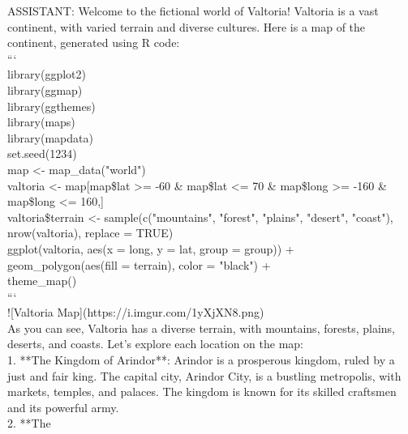 \documentclass[10pt]{article}
\begin{document}
\begin{Form}
\begin{tcolorbox}[colback=convbg,colframe=itemframe,boxrule=0.8pt,arc=2pt,breakable,left=6pt,right=6pt,top=5pt,bottom=5pt]
{ASSISTANT: Welcome to the fictional world of Valtoria! Valtoria is a vast continent, with varied terrain and diverse cultures. Here is a map of the continent, generated using R code: \\[2pt]
``` \\[2pt]
library(ggplot2) \\[2pt]
library(ggmap) \\[2pt]
library(ggthemes) \\[2pt]
library(maps) \\[2pt]
library(mapdata) \\[2pt]
set.seed(1234) \\[2pt]
map <- map\_data("world") \\[2pt]
valtoria <- map[map\$lat >= -60 \& map\$lat <= 70 \& map\$long >= -160 \& map\$long <= 160,] \\[2pt]
valtoria\$terrain <- sample(c("mountains", "forest", "plains", "desert", "coast"), nrow(valtoria), replace = TRUE) \\[2pt]
ggplot(valtoria, aes(x = long, y = lat, group = group)) + \\[2pt]
geom\_polygon(aes(fill = terrain), color = "black") + \\[2pt]
theme\_map() \\[2pt]
``` \\[2pt]
![Valtoria Map](https://i.imgur.com/1yXjXN8.png) \\[2pt]
As you can see, Valtoria has a diverse terrain, with mountains, forests, plains, deserts, and coasts. Let's explore each location on the map: \\[2pt]
1. **The Kingdom of Arindor**: Arindor is a prosperous kingdom, ruled by a just and fair king. The capital city, Arindor City, is a bustling metropolis, with markets, temples, and palaces. The kingdom is known for its skilled craftsmen and its powerful army. \\[2pt]
2. **The}
\end{tcolorbox}
\vspace{-1pt}
\CheckBox[name=q0c,width=1.6ex,height=1.6ex,bordercolor={0.45 0.45 0.45}]{~\textcolor{cbox}{COMPACT}}\quad
\CheckBox[name=q0d,width=1.6ex,height=1.6ex,bordercolor={0.45 0.45 0.45}]{~\textcolor{dbox}{DIFFUSE}}\quad
\CheckBox[name=q0n,width=1.6ex,height=1.6ex,bordercolor={0.45 0.45 0.45}]{~\textcolor{nbox}{NONE}}
\vspace{8pt}
\begin{tcolorbox}[colback=convbg,colframe=itemframe,boxrule=0.8pt,arc=2pt,breakable,left=6pt,right=6pt,top=5pt,bottom=5pt]

\end{tcolorbox}
\end{Form}
\end{document}
